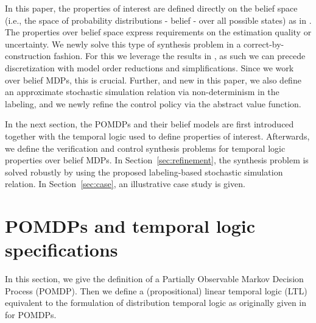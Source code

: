 \documentclass{ifacconf}
\begin{document}
In this paper, the properties of interest are defined directly on the belief space (i.e., the space of probability distributions - belief - over all possible states) as in \citep{Vasile2016,JonesDTL2013}. The properties over belief space express requirements on the estimation quality or uncertainty. 
We newly solve this type of synthesis problem in a correct-by-construction fashion.  For this we leverage the results in \citep{haesaert2017verification, tech_report_TACAS}, as such we can precede  discretization %
with model order reductions and simplifications.  Since we work over belief MDPs, this is crucial.  Further, and new in this paper, we also define an approximate stochastic simulation relation via non-determinism in the labeling, and we newly refine the control policy via the abstract value function.

 
  
 In the next section, the POMDPs and their belief models are first introduced together with the temporal logic used to define properties of interest. 
 Afterwards, we define the verification and control synthesis problems for temporal logic properties over belief MDPs.
 In Section~\ref{sec:refinement}, the synthesis problem is solved robustly by using the proposed labeling-based stochastic simulation relation. In Section~\ref{sec:case}, an illustrative case study is given.
 
\section{POMDPs and temporal logic specifications}

In this section, we give the definition of a Partially Observable Markov Decision Process (POMDP). Then we define a (propositional) linear temporal logic (LTL)  equivalent to the formulation of distribution temporal logic as originally given in \citep{JonesDTL2013} for POMDPs. 
\end{document}
